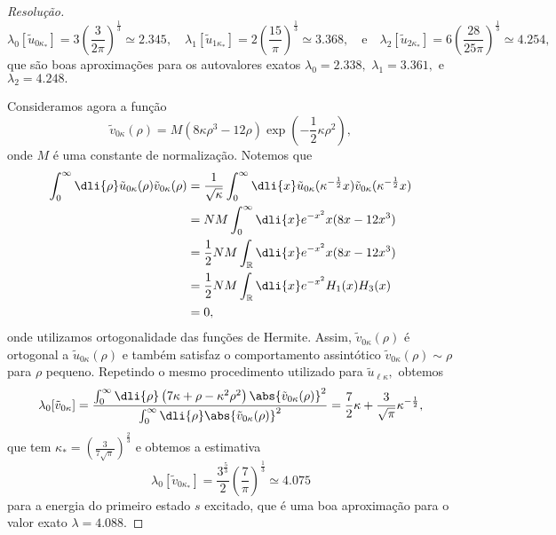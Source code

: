 \begin{proof}[Resolução]
   \begin{equation*}
      \lambda_{0}[\tilde{u}_{0\kappa_*}] = 3\left(\frac{3}{2\pi}\right)^{\frac13} \simeq 2.345,\quad
      \lambda_{1}[\tilde{u}_{1\kappa_*}] = 2\left(\frac{15}{\pi}\right)^{\frac13} \simeq 3.368,\quad\text{e}\quad
      \lambda_{2}[\tilde{u}_{2\kappa_*}] = 6\left(\frac{28}{25\pi}\right)^{\frac13} \simeq 4.254,
   \end{equation*}
   que são boas aproximações para os autovalores exatos \(\lambda_0 = 2.338,\) \(\lambda_1 = 3.361,\) e \(\lambda_2 = 4.248.\)

   Consideramos agora a função
   \begin{equation*}
      \tilde{v}_{0 \kappa}(\rho) = M\left(8\kappa\rho^3 - 12 \rho\right) \exp\left(-\frac12\kappa \rho^2\right),
   \end{equation*}
   onde \(M\) é uma constante de normalização. Notemos que
   \begin{align*}
      \int_0^\infty \dli{\rho} \tilde{u}_{0 \kappa}(\rho) \tilde{v}_{0 \kappa} (\rho) 
      &= \frac{1}{\sqrt{\kappa}}\int_0^\infty \dli{x} \tilde{u}_{0 \kappa}(\kappa^{-\frac12} x) \tilde{v}_{0 \kappa}(\kappa^{-\frac12} x)\\
      &= NM\int_0^{\infty} \dli{x} e^{-x^2} x (8 x - 12 x^3)\\
      &= \frac12 NM \int_{\mathbb{R}} \dli{x} e^{-x^2} x (8 x - 12 x^3)\\
      &= \frac12 NM \int_{\mathbb{R}} \dli{x} e^{-x^2} H_1(x) H_3(x)\\
      &= 0,
   \end{align*}
   onde utilizamos ortogonalidade das funções de Hermite. Assim, \(\tilde{v}_{0 \kappa}(\rho)\) é ortogonal a \(\tilde{u}_{0 \kappa}(\rho)\) e também satisfaz o comportamento assintótico \(\tilde{v}_{0 \kappa}(\rho) \sim \rho\) para \(\rho\) pequeno. Repetindo o mesmo procedimento utilizado para \(\tilde{u}_{\ell \kappa},\) obtemos
   \begin{equation*}
      \lambda_0[\tilde{v}_{0 \kappa}] = \frac{\int_0^\infty\dli{\rho} \left(7 \kappa + \rho - \kappa^2 \rho^2\right)\abs{\tilde{v}_{0 \kappa}(\rho)}^2}{\int_0^\infty \dli{\rho} \abs{\tilde{v}_{0 \kappa}(\rho)}^2} = \frac{7}{2} \kappa + \frac{3}{\sqrt{\pi}} \kappa^{-\frac12},
   \end{equation*}
   que tem \(\kappa_* = \left(\frac{3}{7\sqrt{\pi}}\right)^{\frac23}\) e obtemos a estimativa 
   \begin{equation*}
      \lambda_0[\tilde{v}_{0\kappa_*}] = \frac{3^{\frac53}}{2} \left(\frac{7}{\pi}\right)^{\frac13} \simeq 4.075
   \end{equation*}
   para a energia do primeiro estado \(s\) excitado, que é uma boa aproximação para o valor exato \(\lambda = 4.088.\)
\end{proof}

